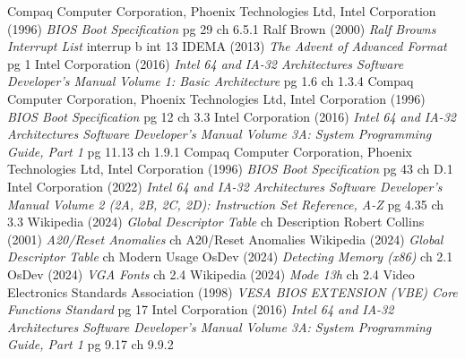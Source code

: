 \documentclass{article}
\begin{document}
\begin{thebibliography}{99}
		Compaq Computer Corporation, Phoenix Technologies Ltd, Intel Corporation (1996)
		\emph{BIOS Boot Specification}
		pg 29 ch 6.5.1
		Ralf Brown (2000)
		\emph{Ralf Browns Interrupt List}
		interrup b int 13
		IDEMA (2013)
		\emph{The Advent of Advanced Format}
		pg 1
		Intel Corporation (2016)
		\emph{Intel 64 and IA-32 Architectures Software Developer’s Manual Volume 1: Basic Architecture}
		pg 1.6 ch 1.3.4
		Compaq Computer Corporation, Phoenix Technologies Ltd, Intel Corporation (1996)
		\emph{BIOS Boot Specification}
		pg 12 ch 3.3
		Intel Corporation (2016)
		\emph{Intel 64 and IA-32 Architectures Software Developer’s Manual Volume 3A: System Programming Guide, Part 1}
		pg 11.13 ch 1.9.1
		Compaq Computer Corporation, Phoenix Technologies Ltd, Intel Corporation (1996)
		\emph{BIOS Boot Specification}
		pg 43 ch D.1
		Intel Corporation (2022)
		\emph{Intel 64 and IA-32 Architectures Software Developer’s Manual Volume 2 (2A, 2B, 2C, 2D): Instruction Set Reference, A-Z}
		pg 4.35 ch 3.3
		Wikipedia (2024)
		\emph{Global Descriptor Table}
		ch Description
		Robert Collins (2001)
		\emph{A20/Reset Anomalies}
		ch A20/Reset Anomalies
		Wikipedia (2024)
		\emph{Global Descriptor Table}
		ch Modern Usage
		OsDev (2024)
		\emph{Detecting Memory (x86)}
		ch 2.1
		OsDev (2024)
		\emph{VGA Fonts}
		ch 2.4
		Wikipedia (2024)
		\emph{Mode 13h}
		ch 2.4
		Video Electronics Standards Association (1998)
		\emph{VESA BIOS EXTENSION (VBE) Core Functions Standard}
		pg 17
		Intel Corporation (2016)
		\emph{Intel 64 and IA-32 Architectures Software Developer’s Manual Volume 3A: System Programming Guide, Part 1}
		pg 9.17 ch 9.9.2
\end{thebibliography}
\end{document}
